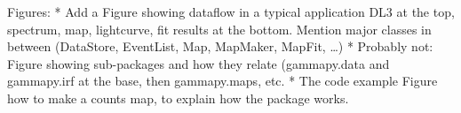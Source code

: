 Figures: * Add a Figure showing dataflow in a typical application DL3 at the
top, spectrum, map, lightcurve, fit results at the bottom. Mention major
classes in between (DataStore, EventList, Map, MapMaker, MapFit, …) * Probably
not: Figure showing sub-packages and how they relate (gammapy.data and
gammapy.irf at the base, then gammapy.maps, etc. * The code example Figure how
to make a counts map, to explain how the package works.














